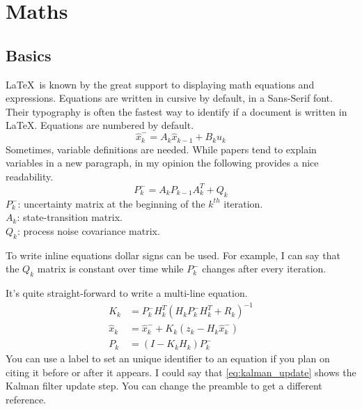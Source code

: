 \chapter{Maths}

\section{Basics}
\noindent \LaTeX \ is known by the great support to displaying math equations and expressions. Equations are written in cursive by default, in a Sans-Serif font. Their typography is often the fastest way to identify if a document is written in \LaTeX. Equations are numbered by default.
\begin{equation}
    \hat{x}_k^- = A_k \hat{x}_{k-1} + B_k u_k 
\end{equation}
%
\noindent Sometimes, variable definitions are needed. While papers tend to explain variables in a new paragraph, in my opinion the following provides a nice readability.
\begin{equation}
    P_k^- = A_k P_{k-1} A^T_k + Q_k 
\end{equation}
\indent $P_k^-$: uncertainty matrix at the beginning of the $k^{th}$ iteration. \\
\indent $A_k$: state-transition matrix. \\
\indent $Q_k$: process noise covariance matrix. 

\noindent To write inline equations dollar signs can be used. For example, I can say that the $Q_k$ matrix is constant over time while $P_k^-$ changes after every iteration.

\noindent It's quite straight-forward to write a multi-line equation.
\begin{equation} \label{eq:kalman_update}
    \begin{split}
        K_k &= P_k^- H_k^T \left( H_k P_k^- H_k^T + R_k \right)^{-1} \\
        \hat{x}_k &= \hat{x}_k^- + K_k \left( z_k - H_k \hat{x}_k^- \right) \\
        P_k &= \left( I - K_k H_k \right) P_k^-
    \end{split}
\end{equation}
%
\noindent You can use a label to set an unique identifier to an equation if you plan on citing it before or after it appears. I could say that \eqref{eq:kalman_update} shows the Kalman filter update step. You can change the preamble to get a different reference.


